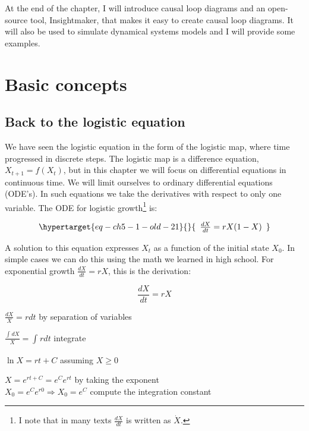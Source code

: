 \documentclass[
  letterpaper,
]{scrbook}
\begin{document}
At the end of the chapter, I will introduce causal loop diagrams and an
open-source tool, Insightmaker, that makes it easy to create causal loop
diagrams. It will also be used to simulate dynamical systems models and
I will provide some examples.

\hypertarget{basic-concepts}{%
\section{Basic concepts}\label{basic-concepts}}

\hypertarget{back-to-the-logistic-equation}{%
\subsection{Back to the logistic
equation}\label{back-to-the-logistic-equation}}

We have seen the logistic equation in the form of the logistic map,
where time progressed in discrete steps. The logistic map is a
difference equation, \(X_{t + 1} = f(X_{t})\), but in this chapter we
will focus on differential equations in continuous time. We will limit
ourselves to ordinary differential equations (ODE's). In such equations
we take the derivatives with respect to only one variable. The ODE for
logistic growth\footnote{I note that in many texts \(\frac{dX}{dt}\) is
  written as \(\dot{X}\).} is:

\begin{equation}\protect\hypertarget{eq-ch5-1-old-21}{}{\begin{array}{r}
\frac{dX}{dt} = rX(1 - X)
\end{array}}\label{eq-ch5-1-old-21}\end{equation}

A solution to this equation expresses \(X_{t}\) as a function of the
initial state \(X_{0}\). In simple cases we can do this using the math
we learned in high school. For exponential growth
\(\frac{dX}{dt} = rX\), this is the derivation:

\[\frac{dX}{dt} = rX\]

\(\frac{dX}{X} = rdt\) by separation of variables

\(\frac{\int_{}^{}{dX}}{X} = \int_{}^{}{rdt}\) integrate

\(\ln X = rt + C\) assuming \(X \geq 0\)

\(X = e^{rt + C} = e^{C}e^{rt}\) by taking the exponent\\
\(X_{0} = e^{C}e^{r0} \Longrightarrow X_{0} = e^{C}\) compute the
integration constant
\end{document}
